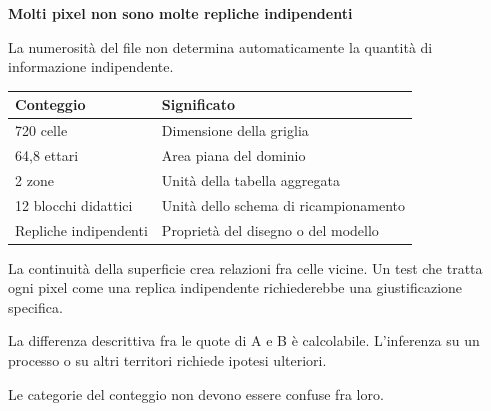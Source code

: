 \documentclass[12pt,aspectratio=1610]{beamer}
\newcommand{\PBody}[1]{\par{\fontsize{11.3}{14.8}\selectfont #1\par}}
\newcommand{\PSmall}[1]{\par{\fontsize{9.8}{13.1}\selectfont #1\par}}
\newcommand{\PInfo}[1]{%
\begin{tcolorbox}[enhanced,arc=1.6mm,boxrule=.55pt,colback=GeoTint,
 colframe=Rule!80!Classical,left=2.3mm,right=2.3mm,top=2mm,bottom=2mm,
 before skip=1mm,after skip=1mm]
\PSmall{#1}\end{tcolorbox}}
\begin{document}
\begin{frame}[plain]\hypertarget{slide95}{}
\begin{lrbox}{\TitleBox}
\begin{minipage}[t]{17.7cm}\raggedright\color{Ink}\fontsize{11.3}{14.8}\selectfont
\color{Navy}\bfseries\fontsize{20.6}{24.5}\selectfont Molti pixel non sono molte repliche indipendenti
\end{minipage}\end{lrbox}

\begin{lrbox}{\RecallBox}
\begin{minipage}[t]{14.3cm}\raggedright\color{Ink}\fontsize{11.3}{14.8}\selectfont
\fontsize{10.3}{13.8}\selectfont La numerosità del file non determina automaticamente la quantità di informazione indipendente.
\end{minipage}\end{lrbox}

\begin{lrbox}{\PilotLeftBox}
\begin{minipage}[t]{10.05cm}\raggedright\color{Ink}\fontsize{11.3}{14.8}\selectfont
{\fontsize{10.2}{13.1}\selectfont\renewcommand{\arraystretch}{1.45}\begin{tabular}{@{}p{4.2cm}p{4.8cm}@{}}\toprule
\textbf{Conteggio} & \textbf{Significato}\\\midrule
720 celle & Dimensione della griglia\\
64,8 ettari & Area piana del dominio\\
2 zone & Unità della tabella aggregata\\
12 blocchi didattici & Unità dello schema di ricampionamento\\
Repliche indipendenti & Proprietà del disegno o del modello\\
\bottomrule\end{tabular}}

\end{minipage}\end{lrbox}

\begin{lrbox}{\PilotRightBox}
\begin{minipage}[t]{7.55cm}\raggedright\color{Ink}\fontsize{11.3}{14.8}\selectfont
\PBody{La continuità della superficie crea relazioni fra celle vicine. Un test che tratta ogni pixel come una replica indipendente richiederebbe una giustificazione specifica.}
\vspace{2.5mm}
\PInfo{La differenza descrittiva fra le quote di A e B è calcolabile. L’inferenza su un processo o su altri territori richiede ipotesi ulteriori.}
\PBody{Le categorie del conteggio non devono essere confuse fra loro.}
\vspace{2.5mm}


\end{minipage}
\end{lrbox}
\end{frame}
\end{document}
